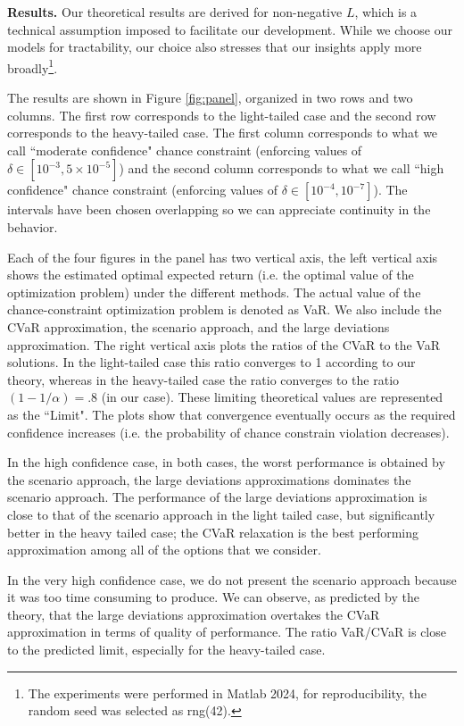 \documentclass[a4paper, a4wide, 10pt, reqno]{amsart}
\theoremstyle{plain}
\begin{document}
\medskip
\noindent\textbf{Results.}
Our theoretical results are derived for non-negative $L$, which is a technical assumption imposed to facilitate our development. While we choose our models for tractability, our choice also stresses that our insights apply more broadly\footnote{The experiments were performed in Matlab 2024, for reproducibility, the random seed was selected as rng(42).}. 

The results are shown in Figure \ref{fig:panel}, organized in two rows and two columns. The first row corresponds to the light-tailed case and the second row corresponds to the heavy-tailed case. The first column corresponds to what we call ``moderate confidence" chance constraint (enforcing values of $\delta  \in [10^{-3},5\times10^{-5}]$) and the second column corresponds to what we call ``high confidence" chance constraint (enforcing values of $\delta \in [10^{-4},10^{-7}]$). The intervals have been chosen overlapping so we can appreciate continuity in the behavior. 

Each of the four figures in the panel has two vertical axis, the left vertical axis shows the estimated optimal expected return (i.e. the optimal value of the optimization problem) under the different methods. The actual value of the chance-constraint optimization problem is denoted as VaR. We also include the CVaR approximation, the scenario approach, and the large deviations approximation. The right vertical axis plots the ratios of the CVaR to the VaR solutions. In the light-tailed case this ratio converges to 1 according to our theory, whereas in the heavy-tailed case the ratio converges to the ratio $(1-1/\alpha)=.8$ (in our case). These limiting theoretical values are represented as the ``Limit". The plots show that convergence eventually occurs as the required confidence increases (i.e. the probability of chance constrain violation decreases).

In the high confidence case, in both cases, the worst performance is obtained by the scenario approach, the large deviations approximations dominates the scenario approach.  The performance of the large deviations approximation is close to that of the scenario approach in the light tailed case, but significantly better in the heavy tailed case; the CVaR relaxation is the best performing approximation among all of the options that we consider.

In the very high confidence case, we do not present the scenario approach because it was too time consuming to produce. We can observe, as predicted by the theory, that the large deviations approximation overtakes the CVaR approximation in terms of quality of performance. The ratio VaR/CVaR is close to the predicted limit, especially for the heavy-tailed case.
\end{document}
